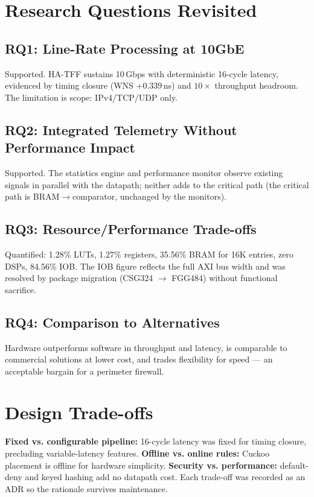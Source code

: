 \documentclass[12pt,twoside,openright]{book}
\begin{document}
\section{Research Questions Revisited}

\subsection{RQ1: Line-Rate Processing at 10GbE}

Supported. HA-TFF sustains 10\,Gbps with deterministic 16-cycle latency, evidenced by timing
closure (WNS $+0.339$\,ns) and $10\times$ throughput headroom. The limitation is scope: IPv4/TCP/UDP
only.

\subsection{RQ2: Integrated Telemetry Without Performance Impact}

Supported. The statistics engine and performance monitor observe existing signals in parallel with
the datapath; neither adds to the critical path (the critical path is BRAM$\to$comparator,
unchanged by the monitors).

\subsection{RQ3: Resource/Performance Trade-offs}

Quantified: 1.28\% LUTs, 1.27\% registers, 35.56\% BRAM for 16K entries, zero DSPs, 84.56\% IOB.
The IOB figure reflects the full AXI bus width and was resolved by package migration (CSG324
$\to$ FGG484) without functional sacrifice.

\subsection{RQ4: Comparison to Alternatives}

Hardware outperforms software in throughput and latency, is comparable to commercial solutions at
lower cost, and trades flexibility for speed --- an acceptable bargain for a perimeter firewall.

\section{Design Trade-offs}

\textbf{Fixed vs. configurable pipeline:} 16-cycle latency was fixed for timing closure, precluding
variable-latency features. \textbf{Offline vs. online rules:} Cuckoo placement is offline for
hardware simplicity. \textbf{Security vs. performance:} default-deny and keyed hashing add no
datapath cost. Each trade-off was recorded as an ADR so the rationale survives maintenance.
\end{document}
